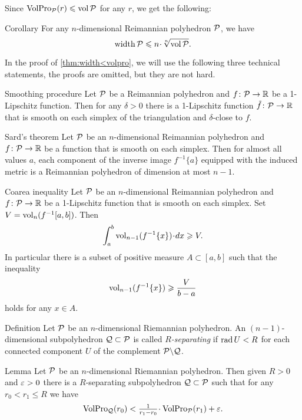 Since $\operatorname{\rm VolPro}\nolimits_{\mathcal{P}}(r)\leqslant \operatorname{\rm vol}\nolimits\mathcal{P}$ for any $r$,
we get the following:

\begin{thm}{Corollary}\label{thm:width<vol}
For any $n$-dimensional Reimannian polyhedron $\mathcal{P}$, we have
\[\width\spc{P}\le n\cdot \sqrt[n]{\vol\spc{P}}.\]

\end{thm}

In the proof of \ref{thm:width<volpro}, we will use the following three technical statements,
the proofs are omitted, but they are not hard. 

\begin{thm}{Smoothing procedure}
Let $\mathcal{P}$ be a Reimannian polyhedron and $f\colon\mathcal{P}\to \mathbb{R}$ be a 1-Lipschitz function.
Then for any $\delta>0$ there is a  1-Lipschitz function $\tilde f\colon\mathcal{P}\to \mathbb{R}$ that is smooth on each simplex of the triangulation and $\delta$-close to $f$.
\end{thm}

\begin{thm}{Sard's theorem}
Let $\mathcal{P}$ be an $n$-dimensional Reimannian polyhedron and $f\colon\mathcal{P}\to \mathbb{R}$ be a function that is smooth on each simplex.
Then for almost all values $a$, each component of the inverse image $f^{-1}\{a\}$ equipped with the induced metric is a Reimannian polyhedron of dimension at most $n-1$.
\end{thm}


\begin{thm}{Coarea inequality}
Let $\mathcal{P}$ be an $n$-dimensional Reimannian polyhedron and $f\colon\mathcal{P}\to \mathbb{R}$ be a 1-Lipschitz function that is smooth on each simplex.
Set $V=\operatorname{\rm vol}\nolimits_n (f^{-1}[a,b])$.
Then 
\[\int_a^b\vol_{n-1}(f^{-1}\{x\})\cdot dx\ge V .\]
In particular there is a subset of positive measure $A\subset [a,b]$ such that the inequality 
\[\operatorname{\rm vol}\nolimits_{n-1}(f^{-1}\{x\})\geqslant \frac V{b-a}\]
holds for any $x\in A$.
\end{thm}

\begin{thm}{Definition}
Let $\mathcal{P}$ be an $n$-dimensional Riemannian polyhedron.
An $(n-1)$-dimensional subpolyhedron $\mathcal{Q}\subset\mathcal{P}$ is called \emph{$R$-separating} if $\mathop{\rm rad}\nolimits U<R$ for each connected component $U$ of the complement $\mathcal{P}\backslash \mathcal{Q}$.
\end{thm}



\begin{thm}{Lemma}\label{lem:separating}
Let $\mathcal{P}$ be an $n$-dimensional Riemannian polyhedron.
Then given $R>0$ and $\varepsilon>0$ there is a $R$-separating subpolyhedron $\mathcal{Q}\subset\mathcal{P}$ such that for any $r_0<r_1\le R$ we have
\[\VolPro_{\spc{Q}}(r_0)< \tfrac1{r_1-r_0}\cdot \VolPro_{\spc{P}}(r_1)+\eps.\]

\end{thm}

